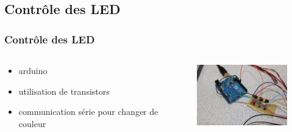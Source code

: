 \subsection{Contrôle des LED}
\begin{frame}
  \frametitle{Contrôle des LED}
  \begin{columns}[c]
    \begin{column}[T]{0.5\textwidth}
      \begin{itemize}
        \item arduino
        \item utilisation de transistors
        \item communication série pour changer de couleur
      \end{itemize}
    \end{column}
    \begin{column}[T]{0.5\textwidth}
      \begin{figure}
        \includegraphics[width=5cm]{../img/arduino+transistorcard.JPG}
      \end{figure}
    \end{column}
  \end{columns}
\end{frame}
